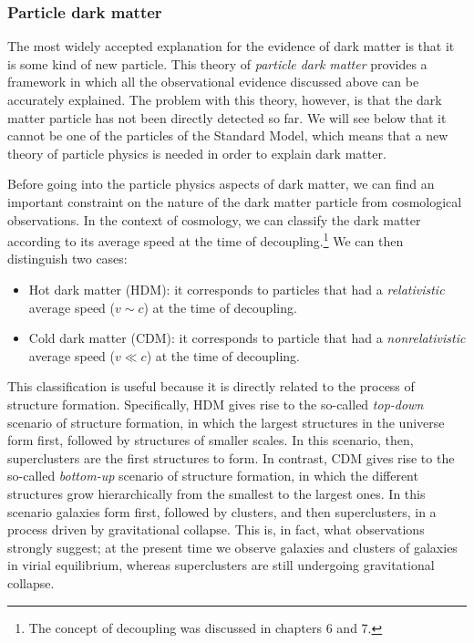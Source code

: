 \documentclass[11pt, a4paper,oneside,openright]{book}
\numberwithin{equation}{section}
\begin{document}
\subsubsection{Particle dark matter}

The most widely accepted explanation for the evidence of dark matter is that it is some kind of new particle. This theory of {\it particle dark matter} provides a framework in which all the observational evidence discussed above can be accurately explained. The problem with this theory, however, is that the dark matter particle has not been directly detected so far. We will see below that it cannot be one of the particles of the Standard Model, which means that a new theory of particle physics is needed in order to explain dark matter.

Before going into the particle physics aspects of dark matter, we can find an important constraint on the nature of the dark matter particle from cosmological observations. In the context of cosmology, we can classify the dark matter according to its average speed at the time of decoupling.\footnote{The concept of decoupling was discussed in chapters 6 and 7.} We can then distinguish two cases:
\begin{itemize}
\item Hot dark matter (HDM): it corresponds to particles that had a {\it relativistic} average speed ($v\sim c$) at the time of decoupling.
\item Cold dark matter (CDM): it corresponds to particle that had a {\it nonrelativistic} average speed ($v\ll c$) at the time of decoupling.
\end{itemize}
This classification is useful because it is directly related to the process of structure formation. Specifically, HDM gives rise to the so-called {\it top-down} scenario of structure formation, in which the largest structures in the universe form first, followed by structures of smaller scales. In this scenario, then, superclusters are the first structures to form. In contrast, CDM gives rise to the so-called {\it bottom-up} scenario of structure formation, in which the different structures grow hierarchically from the smallest to the largest ones. In this scenario galaxies form first, followed by clusters, and then superclusters, in a process driven by gravitational collapse. This is, in fact, what observations strongly suggest; at the present time we observe galaxies and clusters of galaxies in virial equilibrium, whereas superclusters are still undergoing gravitational collapse.
\end{document}
